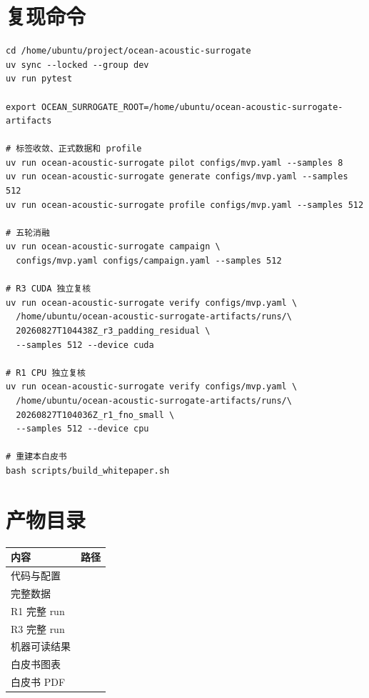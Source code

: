 \documentclass[UTF8,12pt,openany]{ctexrep}
\begin{document}
\appendix
\chapter{复现命令}

\begin{lstlisting}[style=command]
cd /home/ubuntu/project/ocean-acoustic-surrogate
uv sync --locked --group dev
uv run pytest

export OCEAN_SURROGATE_ROOT=/home/ubuntu/ocean-acoustic-surrogate-artifacts

# 标签收敛、正式数据和 profile
uv run ocean-acoustic-surrogate pilot configs/mvp.yaml --samples 8
uv run ocean-acoustic-surrogate generate configs/mvp.yaml --samples 512
uv run ocean-acoustic-surrogate profile configs/mvp.yaml --samples 512

# 五轮消融
uv run ocean-acoustic-surrogate campaign \
  configs/mvp.yaml configs/campaign.yaml --samples 512

# R3 CUDA 独立复核
uv run ocean-acoustic-surrogate verify configs/mvp.yaml \
  /home/ubuntu/ocean-acoustic-surrogate-artifacts/runs/\
  20260827T104438Z_r3_padding_residual \
  --samples 512 --device cuda

# R1 CPU 独立复核
uv run ocean-acoustic-surrogate verify configs/mvp.yaml \
  /home/ubuntu/ocean-acoustic-surrogate-artifacts/runs/\
  20260827T104036Z_r1_fno_small \
  --samples 512 --device cpu

# 重建本白皮书
bash scripts/build_whitepaper.sh
\end{lstlisting}

\chapter{产物目录}

\noindent
\begin{tabularx}{\textwidth}{L{5.0cm}Y}
\toprule
内容 & 路径 \\
\midrule
代码与配置 &  \\
完整数据 &  \\
R1 完整 run &  \\
R3 完整 run &  \\
机器可读结果 &  \\
白皮书图表 &  \\
白皮书 PDF &  \\
\bottomrule
\end{tabularx}
\end{document}
